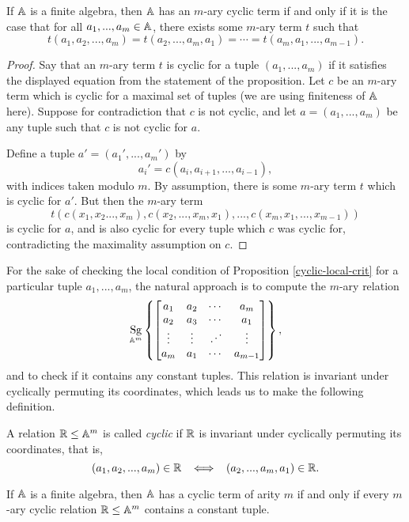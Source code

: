\documentclass[letterpaper,11pt]{article}
\DeclareMathOperator{\Sg}{Sg}
\begin{document}
\begin{prop}\label{cyclic-local-crit} If $\mathbb{A}$ is a finite algebra, then $\mathbb{A}$ has an $m$-ary cyclic term if and only if it is the case that for all $a_1, ..., a_m \in \mathbb{A}$, there exists some $m$-ary term $t$ such that
\[
t(a_1, a_2, ..., a_m) = t(a_2, ..., a_m, a_1) = \cdots = t(a_m, a_1, ..., a_{m-1}).
\]
\end{prop}
\begin{proof} Say that an $m$-ary term $t$ is cyclic for a tuple $(a_1, ..., a_m)$ if it satisfies the displayed equation from the statement of the proposition. Let $c$ be an $m$-ary term which is cyclic for a maximal set of tuples (we are using finiteness of $\mathbb{A}$ here). Suppose for contradiction that $c$ is not cyclic, and let $a = (a_1, ..., a_m)$ be any tuple such that $c$ is not cyclic for $a$.

Define a tuple $a' = (a_1', ..., a_m')$ by
\[
a_i' = c(a_i, a_{i+1}, ..., a_{i-1}),
\]
with indices taken modulo $m$. By assumption, there is some $m$-ary term $t$ which is cyclic for $a'$. But then the $m$-ary term
\[
t(c(x_1, x_2 ..., x_m), c(x_2, ..., x_m, x_1), ..., c(x_m, x_1, ..., x_{m-1}))
\]
is cyclic for $a$, and is also cyclic for every tuple which $c$ was cyclic for, contradicting the maximality assumption on $c$.
\end{proof}

For the sake of checking the local condition of Proposition \ref{cyclic-local-crit} for a particular tuple $a_1, ..., a_m$, the natural approach is to compute the $m$-ary relation
\[
\Sg_{\bA^m}\left\{\begin{bmatrix} a_1 & a_2 & \cdots & a_m\\ a_2 & a_3 & \cdots & a_1\\ \vdots & \vdots & \iddots & \vdots\\ a_m & a_1 & \cdots & a_{m-1}\end{bmatrix}\right\},
\]
and to check if it contains any constant tuples. This relation is invariant under cyclically permuting its coordinates, which leads us to make the following definition.

\begin{defn} A relation $\mathbb{R} \le \mathbb{A}^m$ is called \emph{cyclic} if $\mathbb{R}$ is invariant under cyclically permuting its coordinates, that is,
\[
(a_1, a_2, ..., a_m) \in \mathbb{R} \;\; \iff \;\; (a_2, ..., a_m, a_1) \in \mathbb{R}.
\]
\end{defn}

\begin{cor} If $\mathbb{A}$ is a finite algebra, then $\mathbb{A}$ has a cyclic term of arity $m$ if and only if every $m$-ary cyclic relation $\mathbb{R} \le \mathbb{A}^m$ contains a constant tuple.
\end{cor}
\end{document}
